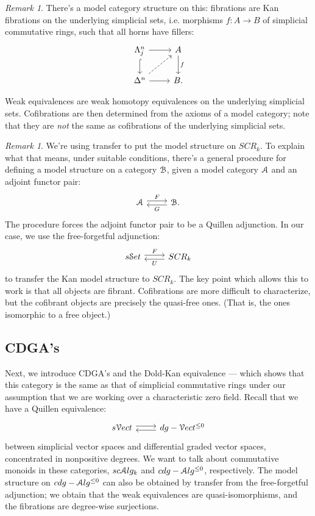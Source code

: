 \documentclass[10pt,a4paper,reqno,oneside]{book} %
\theoremstyle{plain}
\theoremstyle{definition}
\theoremstyle{remark}
\newtheorem{rem}[thm]{Remark}
\numberwithin{equation}{section}
\begin{document}
\begin{rem}
There's a model category structure on this: fibrations are Kan fibrations on the underlying simplicial sets, i.e. morphisms
$f: A \to B$ of simplicial commutative rings, such that all horns have fillers:
\[
\begin{tikzcd}
\Lambda^n_j\arrow[hook]{d}\arrow{r} & A\arrow{d}{f} \\
\Delta^n\arrow{r}\arrow[dashed]{ur} & B.
\end{tikzcd}
\]

Weak equivalences
are weak homotopy equivalences on the underlying simplicial sets. Cofibrations are then determined from the axioms of a
model category; note that they are \textit{not} the same as cofibrations of the underlying simplicial sets.
\end{rem}

\begin{rem}
\label{rem:transfer_model_structure}
We're using transfer to put the model structure on $SCR_k$. To explain what that means, under suitable conditions, there's 
a general procedure for defining a model structure on a category $\mathcal B$, given a model category $\mathcal A$ and an adjoint functor
pair:
\[
\begin{tikzcd}
 \cA \arrow[shift left]{r}{F} & \cB \arrow[shift left]{l}{G} .
\end{tikzcd}
\]
The procedure forces the adjoint functor pair to be a Quillen adjunction. In our case, we use the free-forgetful adjunction:
\[
\begin{tikzcd}
 s\cS et \arrow[shift left]{r}{F} & SCR_k \arrow[shift left]{l}{U}
\end{tikzcd}
\]
to transfer the Kan model structure to $SCR_k$. The key point which allows this to work is that all objects are fibrant. 
Cofibrations are more difficult to characterize, but the cofibrant objects are precisely the quasi-free ones. (That is,
the ones isomorphic to a free object.)
\end{rem}

\subsection{CDGA's}

Next, we introduce CDGA's and the Dold-Kan equivalence --- which shows that this category is the same as that of simplicial commutative rings under our assumption that we are working over a characteristic zero field. Recall that we have a Quillen equivalence:
\[
\begin{tikzcd}
	s\cV ect \arrow[shift left]{r} & dg-\cV ect^{\leq 0} \arrow[shift left]{l}
\end{tikzcd}
\]
between simplicial vector spaces and differential graded vector spaces, concentrated in nonpositive degrees. We want to
talk about commutative monoids in these categories, $sc\mathcal A lg_k$ and $cdg-\mathcal A lg^{\leq 0}$, respectively.
The model structure on $cdg-\mathcal A lg^{\leq 0}$ can also be obtained by transfer from the free-forgetful adjunction; we obtain
that the weak equivalences are quasi-isomorphisms, and the fibrations are degree-wise surjections.
\end{document}
